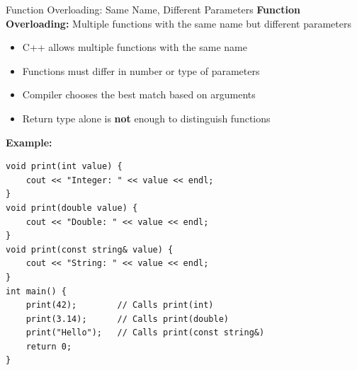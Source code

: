 \begin{frame}[fragile]{Function Overloading: Same Name, Different Parameters}
    \textbf{Function Overloading:} Multiple functions with the same name but different parameters

    \begin{itemize}
        \item C++ allows multiple functions with the same name
        \item Functions must differ in number or type of parameters
        \item Compiler chooses the best match based on arguments
        \item Return type alone is \textbf{not} enough to distinguish functions
    \end{itemize}

    \textbf{Example:}
    \begin{verbatim}
void print(int value) {
    cout << "Integer: " << value << endl;
}
void print(double value) {
    cout << "Double: " << value << endl;
}
void print(const string& value) {
    cout << "String: " << value << endl;
}
int main() {
    print(42);        // Calls print(int)
    print(3.14);      // Calls print(double)
    print("Hello");   // Calls print(const string&)
    return 0;
}
    \end{verbatim}
\end{frame}

